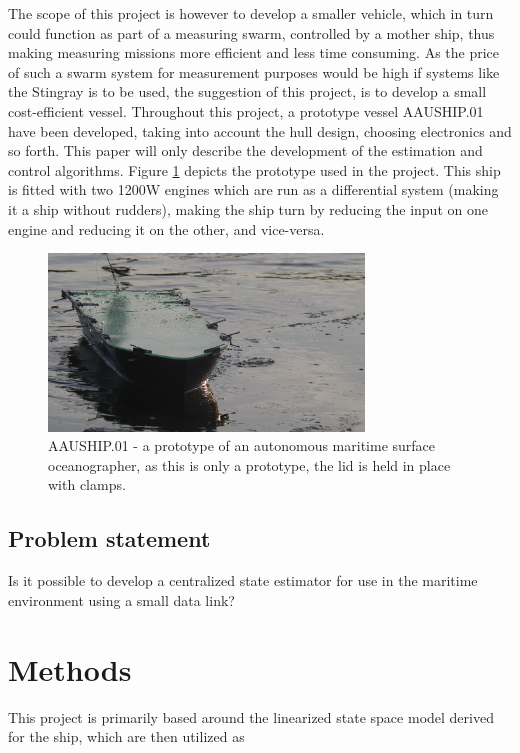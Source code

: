 \documentclass{ifacconf}
\begin{document}
The scope of this project is however to develop a smaller vehicle, which in turn could function as part of a measuring swarm, controlled by a mother ship, thus making measuring missions more efficient and less time consuming. As the price of such a swarm system for measurement purposes would be high if systems like the Stingray is to be used, the suggestion of this project, is to develop a small cost-efficient vessel. Throughout this project, a prototype vessel AAUSHIP.01 have been developed, taking into account the hull design, choosing electronics and so forth. This paper will only describe the development of the estimation and control algorithms. Figure \ref{fig:ship} depicts the prototype used in the project. This ship is fitted with two 1200W engines which are run as a differential system (making it a ship without rudders), making the ship turn by reducing the input on one engine and reducing it on the other, and vice-versa. 

\begin{figure}
	\begin{center}
		\includegraphics[width=8.4cm]{img/aauship.png} %
		\caption{AAUSHIP.01 - a prototype of an autonomous maritime surface oceanographer, as this is only a prototype, the lid is held in place with clamps. }  
		\label{fig:ship}
	\end{center}
\end{figure}

\subsection{Problem statement}
Is it possible to develop a centralized state estimator for use in the maritime environment using a small data link?

\section{Methods}

This project is primarily based around the linearized state space model derived for the ship, which are then utilized as 
\end{document}
